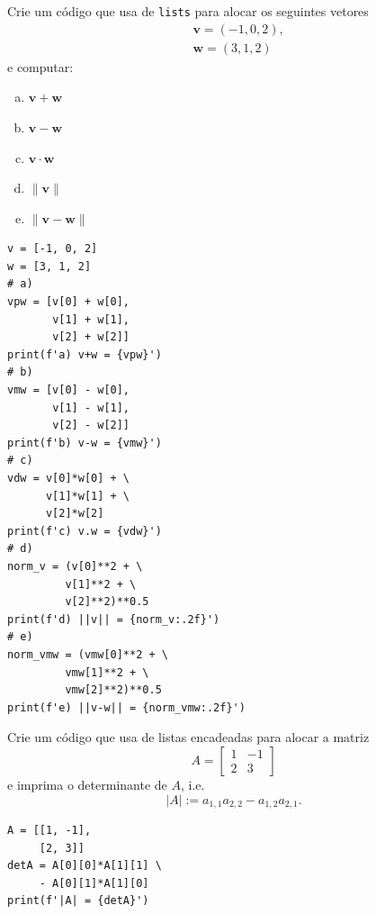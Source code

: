 \begin{exer}
  Crie um código que usa de \texttt{lists} para alocar os seguintes vetores
  \begin{align}
    & \pmb{v} = (-1, 0, 2), \\
    & \pmb{w} = (3, 1, 2)
  \end{align}
  e computar:
  \begin{enumerate}[a)]
  \item $\pmb{v} + \pmb{w}$\\
  \item $\pmb{v} - \pmb{w}$\\
  \item $\pmb{v}\cdot \pmb{w}$\\
  \item $\|\pmb{v}\|$\\
  \item $\|\pmb{v} - \pmb{w}\|$
  \end{enumerate}
\end{exer}
\begin{resp}

\begin{lstlisting}
v = [-1, 0, 2]
w = [3, 1, 2]
# a)
vpw = [v[0] + w[0],
       v[1] + w[1],
       v[2] + w[2]]
print(f'a) v+w = {vpw}')
# b)
vmw = [v[0] - w[0],
       v[1] - w[1],
       v[2] - w[2]]
print(f'b) v-w = {vmw}')
# c)
vdw = v[0]*w[0] + \
      v[1]*w[1] + \
      v[2]*w[2]
print(f'c) v.w = {vdw}')
# d)
norm_v = (v[0]**2 + \
         v[1]**2 + \
         v[2]**2)**0.5
print(f'd) ||v|| = {norm_v:.2f}')
# e)
norm_vmw = (vmw[0]**2 + \
         vmw[1]**2 + \
         vmw[2]**2)**0.5
print(f'e) ||v-w|| = {norm_vmw:.2f}')
\end{lstlisting}

\end{resp}

\begin{exer}
  Crie um código que usa de listas encadeadas para alocar a matriz
  \begin{equation}
    A =
    \begin{bmatrix}
      1 & -1\\
      2 & 3
    \end{bmatrix}
  \end{equation}
  e imprima o determinante de $A$, i.e.
  \begin{equation}
    |A| := a_{1,1}a_{2,2} - a_{1,2}a_{2,1}.
  \end{equation}
\end{exer}
\begin{resp}

\begin{lstlisting}
A = [[1, -1],
     [2, 3]]
detA = A[0][0]*A[1][1] \
     - A[0][1]*A[1][0]
print(f'|A| = {detA}')
\end{lstlisting}

\end{resp}

